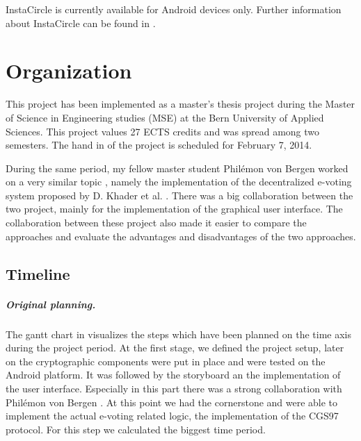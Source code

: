 \documentclass[numbers=noenddot, abstract=on, a4paper, headsepline,
footsepline, oneside, draft=off]{scrreprt}
\begin{document}
InstaCircle is currently available for Android devices only. Further information
about InstaCircle can be found in \cite{ritter13a}.



\chapter{Organization}
\label{cha:organization}
This project has been implemented as a master's thesis project during the
Master of Science in Engineering studies (MSE) at the Bern University of Applied
Sciences. This project values 27 ECTS credits and was spread among two
semesters.
The hand in of the project is scheduled for February 7, 2014.

During the same period, my fellow master student Philémon von Bergen worked on a
very similar topic \cite{vonBergen14}, namely the implementation of the
decentralized e-voting system proposed by D. Khader et al. \cite{HKRS12}. There
was a big collaboration between the two project, mainly for the implementation
of the graphical user interface. The collaboration between these project also
made it easier to compare the approaches and evaluate the advantages and
disadvantages of the two approaches.

\section{Timeline}
\label{sec:planning}
\paragraph{Original planning.} The gantt chart in 
visualizes the steps which have been planned on the time axis during the project period. At the first stage, we
defined the project setup, later on the cryptographic components were put in
place and were tested on the Android platform. It was followed by the storyboard
an the implementation of the user interface. Especially in this part there was a
strong collaboration with Philémon von Bergen \cite{vonBergen14}. At this point
we had the cornerstone and were able to implement the actual e-voting related
logic, the implementation of the CGS97 protocol. For this step we calculated the
biggest time period.
\end{document}
